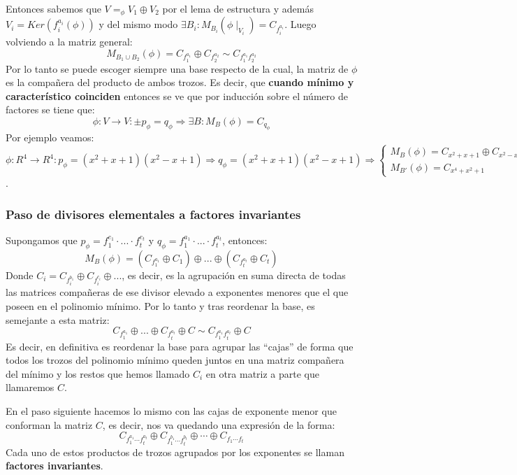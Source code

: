 \documentclass[10pt,a4paper,openright]{book}
\begin{document}
Entonces sabemos que $V=_\phi V_1\oplus V_2$ por el lema de estructura y además $V_i=Ker (f_i^{a_i}(\phi))$ y del mismo modo $\exists B_i: M_{B_i}(\phi\mid_{V_i})=C_{f_i^{a_i}}$. Luego volviendo a la matriz general:
$$M_{B_1\cup B_2}(\phi)=C_{f_1^{a_1}}\oplus C_{f_2^{a_2}}\sim C_{f_1^{a_1}f_2^{a_2}}$$
Por lo tanto se puede escoger siempre una base respecto de la cual, la matriz de $\phi$ es la compañera del producto de ambos trozos.
Es decir, que \textbf{cuando mínimo y característico coinciden} entonces se ve que por inducción sobre el número de factores se tiene que:
$$\phi: V\rightarrow V:\pm p_\phi = q_\phi \Rightarrow \exists B: M_{B}(\phi)=C_{q_{\phi}}$$
Por ejemplo veamos:
$\phi: R^{4}\rightarrow R^{4}: p_\phi=(x^2+x+1)(x^2-x+1)\Rightarrow q_\phi=(x^2+x+1)(x^2-x+1)\Rightarrow \begin{cases} M_{B}(\phi)=C_{x^2+x+1}\oplus C_{x^2-x+1} & \mbox{ por divisores elementales}\\ M_{B'}(\phi)= C_{x^4+x^2+1}& \mbox{ por factores invariantes}\end{cases}$.

\subsubsection*{Paso de divisores elementales a factores invariantes}
Supongamos que $p_\phi = f_1^{e_1}\cdot ... \cdot f_t^{e_t}$ y $q_\phi= f_1^{a_1}\cdot ... \cdot f_t^{a_t}$, entonces:
$$M_B(\phi)=\left(C_{f_1^{a_1}} \oplus C_{1}\right)\oplus ... \oplus \left(C_{f_t^{a_t}} \oplus C_{t}\right)$$
Donde $C_i=C_{f_i^{b_1}}\oplus C_{f_i^{c_i}} \oplus ...$, es decir, es la agrupación en suma directa de todas las matrices compañeras de ese divisor elevado a exponentes menores que el que poseen en el polinomio mínimo. Por lo tanto y tras reordenar la base, es semejante a esta matriz:
$$C_{f_1^{a_1}}\oplus ...\oplus C_{f_t^{a_t}}\oplus C\sim C_{f_1^{a_1}f_t^{a_t}}\oplus C$$
Es decir, en definitiva es reordenar la base para agrupar las ``cajas'' de forma que todos los trozos del polinomio mínimo queden juntos en una matriz compañera del mínimo y los restos que hemos llamado $C_i$ en otra matriz a parte que llamaremos $C$.

En el paso siguiente hacemos lo mismo con las cajas de exponente menor que conforman la matriz $C$, es decir, nos va quedando una expresión de la forma:
$$C_{f_1^{a_1}\cdots f_t^{a_t}}\oplus C_{f_1^{b_1}\cdots f_t^{b_t}} \oplus \cdots \oplus C_{f_1\cdots f_t}$$
Cada uno de estos productos de trozos agrupados por los exponentes se llaman \textbf{factores invariantes}.
\end{document}
